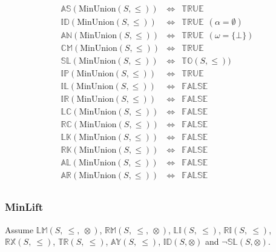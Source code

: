 \documentclass[10pt]{article}
\newcommand{\propname}[1]{{\mathbb{#1}}}
\begin{document}
\[
\begin{array}{rcl} 
\propname{AS}(\mathrm{MinUnion}(S, \leq)) 
  & \Leftrightarrow 
  & \propname{TRUE}
  \\ 
\propname{ID}(\mathrm{MinUnion}(S, \leq)) 
  & \Leftrightarrow 
  & \propname{TRUE} \ \ (\alpha = \emptyset)
  \\ 
\propname{AN}(\mathrm{MinUnion}(S, \leq)) 
  & \Leftrightarrow 
  & \propname{TRUE} \ \ (\omega = \{\bot\})
  \\
\propname{CM}(\mathrm{MinUnion}(S, \leq)) 
  & \Leftrightarrow 
  & \propname{TRUE}
  \\ 
\propname{SL}(\mathrm{MinUnion}(S, \leq)) 
  & \Leftrightarrow 
  & \propname{TO}(S, \leq))  
  \\ 
\propname{IP}(\mathrm{MinUnion}(S, \leq)) 
  & \Leftrightarrow 
  & \propname{TRUE}
  \\ 
\propname{IL}(\mathrm{MinUnion}(S, \leq)) 
  & \Leftrightarrow 
  & \propname{FALSE}
  \\ 
\propname{IR}(\mathrm{MinUnion}(S, \leq)) 
  & \Leftrightarrow 
  & \propname{FALSE}
  \\ 
\propname{LC}(\mathrm{MinUnion}(S, \leq)) 
  & \Leftrightarrow 
  & \propname{FALSE}
  \\ 
\propname{RC}(\mathrm{MinUnion}(S, \leq)) 
  & \Leftrightarrow 
  & \propname{FALSE} 
  \\ 
\propname{LK}(\mathrm{MinUnion}(S, \leq)) 
  & \Leftrightarrow 
  & \propname{FALSE} 
  \\ 
\propname{RK}(\mathrm{MinUnion}(S, \leq)) 
  & \Leftrightarrow 
  & \propname{FALSE}
  \\ 
\propname{AL}(\mathrm{MinUnion}(S, \leq))  
  & \Leftrightarrow 
  & \propname{FALSE} 
  \\ 
\propname{AR}(\mathrm{MinUnion}(S, \leq))  
  & \Leftrightarrow 
  & \propname{FALSE} 
  \\ 
\end{array} 
\] 

\subsubsection{MinLift} 

Assume 
$\propname{LM}(S,\ \leq,\ \otimes)$, 
$\propname{RM}(S,\ \leq,\ \otimes)$, 
$\propname{LI}(S,\ \leq)$,
$\propname{RI}(S,\ \leq)$,
$\propname{RX}(S,\ \leq)$,
$\propname{TR}(S,\ \leq)$,
$\propname{AY}(S,\ \leq)$,
$\propname{ID}(S, \otimes)$ and
$\neg \propname{SL}(S, \otimes)$. 
\end{document}
